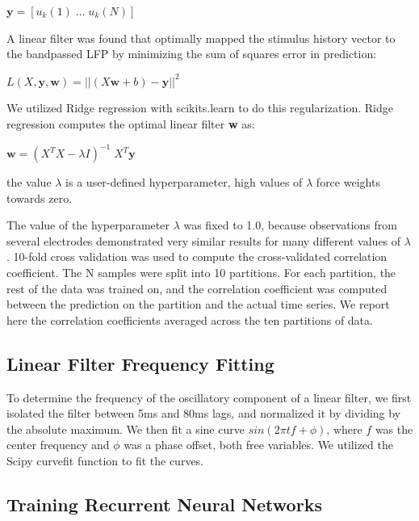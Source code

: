 \begin{center}
$\textbf{y} = [u_k (1) \; ... \; u_k (N)]$
\end{center}

A linear filter was found that optimally mapped the stimulus history vector to the bandpassed LFP by minimizing the sum of squares error in prediction:

\begin{center}
$L(X, \textbf{y}, \textbf{w}) = || (X\textbf{w} + b) - \textbf{y} ||^2$ 
\end{center}

We utilized Ridge regression with scikits.learn to do this regularization. Ridge regression computes the optimal linear filter \textbf{w} as:

\begin{center}
$ \textbf{w} = (X^T X - \lambda I)^{-1} \; X^T \textbf{y}$
\end{center}

the value $\lambda$ is a user-defined hyperparameter, high values of $\lambda$ force weights towards zero. 

The value of the hyperparameter $\lambda$ was fixed to 1.0, because observations from several electrodes demonstrated very similar results for many different values of $\lambda$. 10-fold cross validation was used to compute the cross-validated correlation coefficient. The N samples were split into 10 partitions. For each partition, the rest of the data was trained on, and the correlation coefficient was computed between the prediction on the partition and the actual time series. We report here the correlation coefficients averaged across the ten partitions of data.

\subsection{Linear Filter Frequency Fitting}

To determine the frequency of the oscillatory component of a linear filter, we first isolated the filter between 5ms and 80ms lags, and normalized it by dividing by the absolute maximum. We then fit a sine curve $sin(2\pi t f + \phi)$, where $f$ was the center frequency and $\phi$ was a phase offset, both free variables. We utilized the Scipy curvefit function to fit the curves.

\subsection{Training Recurrent Neural Networks}

